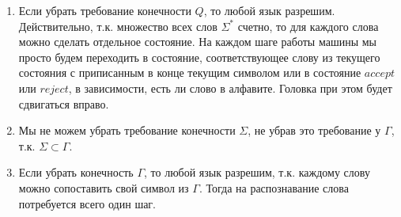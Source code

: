 \begin{task}{1}
\begin{enumerate}
    \item[1)] Если убрать требование конечности $Q$, то любой язык разрешим. Действительно, т.к. множество всех слов $\Sigma^*$ счетно, то для каждого слова можно сделать отдельное состояние. На каждом шаге работы машины мы просто будем переходить в состояние, соответствующее слову из текущего состояния с приписанным в конце текущим символом или в состояние $accept$ или $reject$, в зависимости, есть ли слово в алфавите. Головка при этом будет сдвигаться вправо.
    
    \item[2)] Мы не можем убрать требование конечности $\Sigma$, не убрав это требование у $\Gamma$, т.к. $\Sigma \subset \Gamma$.
    
    \item[3)] Если убрать конечность $\Gamma$, то любой язык разрешим, т.к. каждому слову можно сопоставить свой символ из $\Gamma$. Тогда на распознавание слова потребуется всего один шаг.
\end{enumerate}
\end{task}